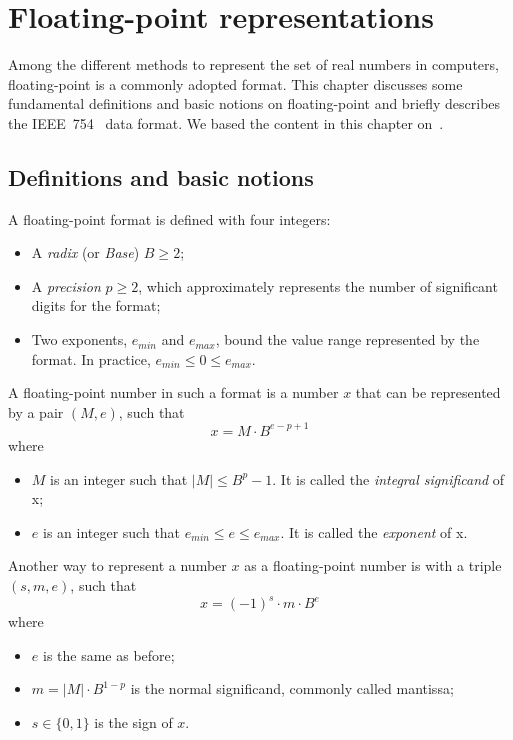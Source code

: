 \chapter{Floating-point representations}
\label{ch:background}
Among the different methods to represent the set of real numbers in computers,
floating-point is a commonly adopted format.
This chapter discusses some fundamental definitions and basic notions on floating-point
and briefly describes the IEEE~754~\cite{4610935} data format.
We based the content in this chapter on~\cite{Muller2018-zm}.

\section{Definitions and basic notions}
A floating-point format is defined with four integers:
\begin{itemize}
	\item A \textit{radix} (or \textit{Base}) $B \ge 2$;
	\item A \textit{precision} $p \ge 2$, which approximately represents the number of significant digits for the format;
	\item Two exponents, $e_{min}$ and $e_{max}$, bound the value range represented by the format. In practice, $e_{min} \le 0 \le e_{max}$.
\end{itemize}

A floating-point number in such a format is a number $x$ that can be represented by a pair $(M,e)$, such that
\begin{equation}
	x = M \cdot B^{e-p+1}
\end{equation}
where
\begin{itemize}
	\item $M$ is an integer such that $|M| \le B^{p}-1$. It is called the \textit{integral significand} of x;
	\item $e$ is an integer such that $e_{min} \le e \le e_{max}$. It is called the \textit{exponent} of x.
\end{itemize}

Another way to represent a number $x$ as a floating-point number is with a triple $(s, m, e)$, such that
\begin{equation}
	x = (-1)^{s} \cdot m \cdot B^{e}
\end{equation}
where
\begin{itemize}
	\item $e$ is the same as before;
	\item $m = |M| \cdot B^{1-p}$ is the normal significand, commonly called mantissa;
	\item $s \in \{0, 1\}$ is the sign of $x$.
\end{itemize}

